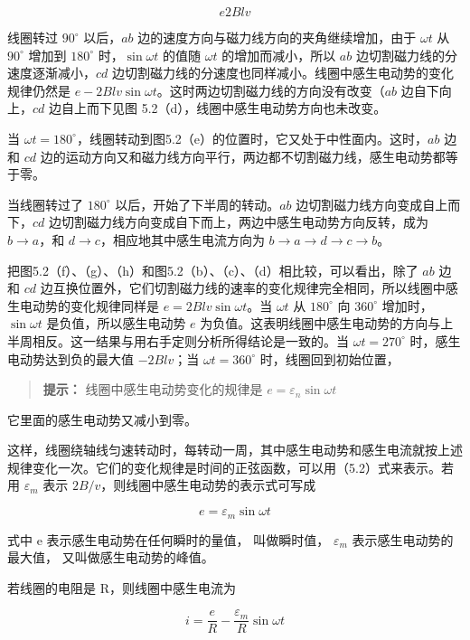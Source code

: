 \[
e 2 B l v
\]

线圈转过 \(90^{\circ}\) 以后，\(ab\)
边的速度方向与磁力线方向的夹角继续增加，由于 \(\omega t\) 从
\(90^{\circ}\) 增加到 \(180^{\circ}\) 时，\(\sin \omega t\) 的值随
\(\omega t\) 的增加而减小，所以 \(ab\)
边切割磁力线的分速度逐渐减小，\(cd\)
边切割磁力线的分速度也同样减小。线圈中感生电动势的变化规律仍然是
\(e - 2Blv\sin \omega t\)。这时两边切割磁力线的方向没有改变（\(ab\)
边自下向上，\(cd\) 边自上而下见图
5.2（d），线圈中感生电动势方向也未改变。

当
\(\omega t = 180^{\circ}\)，线圈转动到图5.2（e）的位置时，它又处于中性面内。这时，\(ab\)
边和 \(cd\)
边的运动方向又和磁力线方向平行，两边都不切割磁力线，感生电动势都等于零。

当线圈转过了 \(180^{\circ}\) 以后，开始了下半周的转动。\(ab\)
边切割磁力线方向变成自上而下，\(cd\)
边切割磁力线方向变成自下而上，两边中感生电动势方向反转，成为
\(b \to a\)，和 \(d \to c\)，相应地其中感生电流方向为
\(b \to a \to d \to c \to b\)。

把图5.2（f）、（g）、（h）和图5.2（b）、（c）、（d）相比较，可以看出，除了
\(ab\) 边和 \(cd\)
边互换位置外，它们切割磁力线的速率的变化规律完全相同，所以线圈中感生电动势的变化规律同样是
\(e = 2B l v \sin \omega t\)。当 \(\omega t\) 从 \(180^{\circ}\) 向
\(360^{\circ}\) 增加时，\(\sin \omega t\) 是负值，所以感生电动势 \(e\)
为负值。这表明线圈中感生电动势的方向与上半周相反。这一结果与用右手定则分析所得结论是一致的。当
\(\omega t = 270^{\circ}\) 时，感生电动势达到负的最大值 \(-2B l v\)；当
\(\omega t = 360^{\circ}\) 时，线圈回到初始位置，

\begin{quote}
\textbf{提示：} 线圈中感生电动势变化的规律是
\(e = \varepsilon_{n}\sin \omega t\)
\end{quote}

它里面的感生电动势又减小到零。

这样，线圈绕轴线匀速转动时，每转动一周，其中感生电动势和感生电流就按上述规律变化一次。它们的变化规律是时间的正弦函数，可以用（5.2）式来表示。若用
\(\varepsilon_{m}\) 表示 \(2B/v\)，则线圈中感生电动势的表示式可写成

\[
e = \varepsilon_{m} \sin \omega t \tag{5.3}
\]

式中 e 表示感生电动势在任何瞬时的量值， 叫做瞬时值， \(\varepsilon_{m}\)
表示感生电动势的最大值， 又叫做感生电动势的峰值。

若线圈的电阻是 R，则线圈中感生电流为

\[
i = \frac{e}{R} - \frac{\varepsilon_{m}}{R} \sin \omega t
\]

